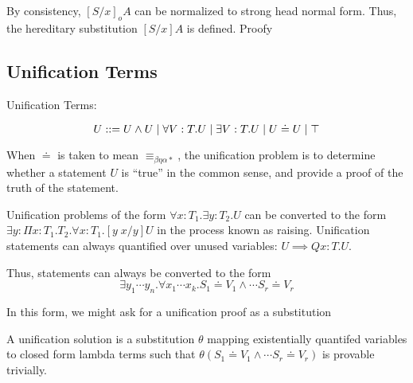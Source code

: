 By consistency, $[S/x]_o A $ can be normalized to strong head normal form.  Thus, the 
hereditary substitution $[S/x] A$ is defined. Proofy

\subsection{Unification Terms}

\begin{definition}
Unification Terms:

\[
U ::= U \wedge U 
 \; | \; \forall V : T . U
 \; | \; \exists V : T . U 
 \; | \; U \doteq U
 \; | \; \top
\]

\end{definition}

When $\doteq$ is taken to mean $\equiv_{\beta\eta\alpha*}$, the unification problem is to determine 
whether a statement $U$ is ``true'' in the common sense, and provide a proof of the truth of the statement. 

Unification problems of the form 
$\forall x : T_1 . \exists y : T_2 . U $ can be converted to the form
$\exists y : \Pi x : T_1 . T_2 . \forall x : T_1 . [y\; x / y ]U $ 
in the process known as raising. Unification
statements can always quantified over unused variables: $U \implies Q x : T . U$.  

Thus, statements can always be converted to the form
\[
\exists y_1 \cdots y_n . \forall x_1 \cdots x_k . S_1 \doteq V_1 \wedge \cdots S_r \doteq V_r
\]

In this form, we might ask for a unification proof as a substitution

\begin{definition}
A unification solution is a substitution $\theta$ 
mapping existentially quantifed
variables to closed form lambda terms such 
that $\theta (S_1 \doteq V_1 \wedge \cdots S_r \doteq V_r)$
is provable trivially. 
\end{definition}

